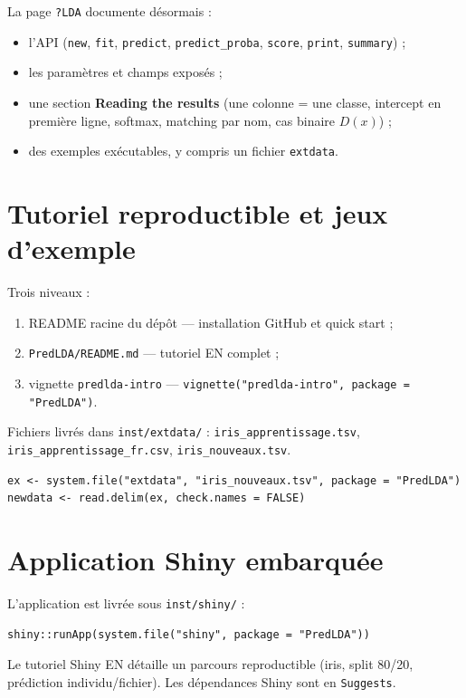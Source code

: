 \documentclass[11pt,a4paper]{article}
\begin{document}
La page \texttt{?LDA} documente d\'esormais :
\begin{itemize}[leftmargin=*]
  \item l'API (\texttt{new}, \texttt{fit}, \texttt{predict},
        \texttt{predict\_proba}, \texttt{score}, \texttt{print}, \texttt{summary}) ;
  \item les param\`etres et champs expos\'es ;
  \item une section \textbf{Reading the results} (une colonne = une classe,
        intercept en premi\`ere ligne, softmax, matching par nom, cas binaire
        $D(x)$) ;
  \item des exemples ex\'ecutables, y compris un fichier \texttt{extdata}.
\end{itemize}

\section{Tutoriel reproductible et jeux d'exemple}

Trois niveaux :
\begin{enumerate}[leftmargin=*]
  \item README racine du d\'ep\^ot --- installation GitHub et quick start ;
  \item \texttt{PredLDA/README.md} --- tutoriel EN complet ;
  \item vignette \texttt{predlda-intro} ---
        \texttt{vignette("predlda-intro", package = "PredLDA")}.
\end{enumerate}

Fichiers livr\'es dans \texttt{inst/extdata/} :
\texttt{iris\_apprentissage.tsv}, \texttt{iris\_apprentissage\_fr.csv},
\texttt{iris\_nouveaux.tsv}.

\begin{lstlisting}
ex <- system.file("extdata", "iris_nouveaux.tsv", package = "PredLDA")
newdata <- read.delim(ex, check.names = FALSE)
\end{lstlisting}

\section{Application Shiny embarqu\'ee}

L'application est livr\'ee sous \texttt{inst/shiny/} :
\begin{lstlisting}
shiny::runApp(system.file("shiny", package = "PredLDA"))
\end{lstlisting}
Le tutoriel Shiny EN d\'etaille un parcours reproductible (iris, split 80/20,
pr\'ediction individu/fichier). Les d\'ependances Shiny sont en
\texttt{Suggests}.
\end{document}
